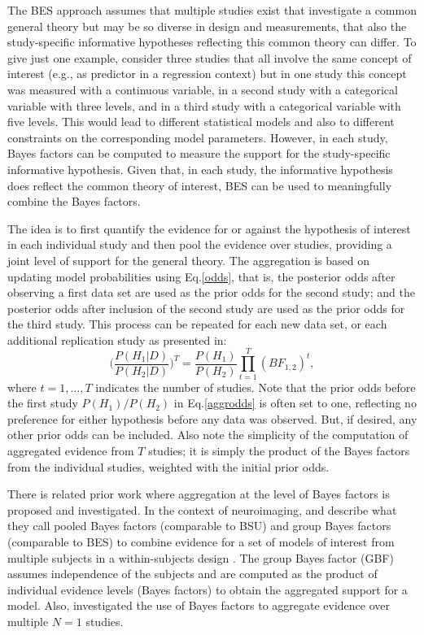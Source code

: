 \documentclass[11pt,reqno]{article}
\begin{document}
The BES approach assumes that multiple studies exist that investigate a common general theory but may be so diverse in design and measurements, that also the study-specific informative hypotheses reflecting this common theory can differ. To give just one example, consider three studies that all involve the same concept of interest (e.g., as predictor in a regression context) but in one study this concept was measured with a continuous variable, in a second study with a categorical variable with three levels, and in a third study with a categorical variable with five levels. This would lead to different statistical models and also to different constraints on the corresponding model parameters. However, in each study, Bayes factors can be computed to measure the support for the study-specific informative hypothesis. Given that, in each study, the informative hypothesis does reflect the common theory of interest, BES can be used to meaningfully combine the Bayes factors.

The idea is to first quantify the evidence for or against the hypothesis of interest in each individual study and then pool the evidence over studies, providing a joint level of support for the general theory.
The aggregation is based on updating model probabilities using Eq.\ref{odds}, that is, the posterior odds after observing a first data set are used as the prior odds for the second study; and the posterior odds after inclusion of the second study are used as the prior odds for the third study. This process can be repeated for each new data set, or each additional replication study as presented in:
\begin{equation}\label{aggrodds}
  \Bigg(\frac{P(H_1|D)}{P(H_2|D)}\Bigg)^T = \frac{P(H_1)}{P(H_2)} \prod_{t=1}^{T}{(BF_{1,2})^t},
\end{equation}
where $t=1, \ldots, T$ indicates the number of studies. Note that the prior odds before the first study $P(H_1)/P(H_2)$ in Eq.\ref{aggrodds} is often set to one, reflecting no preference for either hypothesis before any data was observed. But, if desired, any other prior odds can be included. Also note the simplicity of the computation of aggregated evidence from $T$ studies; it is simply the product of the Bayes factors from the individual studies, weighted with the initial prior odds.

There is related prior work where aggregation at the level of Bayes factors is proposed and investigated. In the context of neuroimaging, \citet{stephan_gbf_2007} and \citet{stephan_gbf_2009} describe what they call pooled Bayes factors (comparable to BSU) and group Bayes factors (comparable to BES) to combine evidence for a set of models of interest from multiple subjects in a within-subjects design \citep[see also][who discuss these methods]{regenwetter_heterogeneity_2018}. The group Bayes factor (GBF) assumes independence of the subjects and are computed as the product of individual evidence levels (Bayes factors) to obtain the aggregated support for a model. Also, \citet[][]{klaassen_all_2018} investigated the use of Bayes factors to aggregate evidence over multiple $N=1$ studies.
\end{document}
